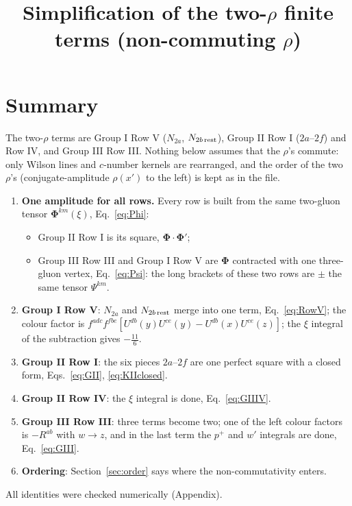 \documentclass[10pt]{article}
\title{Simplification of the two-$\rho$ finite terms (non-commuting $\rho$)}
\author{}
\date{}
\numberwithin{equation}{section}
\begin{document}
\maketitle
\tableofcontents

\section{Summary}

The two-$\rho$ terms are Group I Row V ($N_{2a}$, $N_{2b\,\rm rest}$), Group II Row I ($2a$--$2f$) and Row IV, and Group III Row III. Nothing below assumes that the $\rho$'s commute: only Wilson lines and $c$-number kernels are rearranged, and the order of the two $\rho$'s (conjugate-amplitude $\rho(x')$ to the left) is kept as in the file.

\begin{enumerate}
\item \textbf{One amplitude for all rows.} Every row is built from the same two-gluon tensor $\mathbf{\Phi}^{km}(\xi)$, Eq.~\eqref{eq:Phi}:
\begin{itemize}
\item Group II Row I is its square, $\mathbf{\Phi}\cdot\mathbf{\Phi}'$;
\item Group III Row III and Group I Row V are $\mathbf{\Phi}$ contracted with one three-gluon vertex, Eq.~\eqref{eq:Psi}: the long brackets of these two rows are $\pm$ the same tensor $\Psi^{km}$.
\end{itemize}
\item \textbf{Group I Row V}: $N_{2a}$ and $N_{2b\,\rm rest}$ merge into one term, Eq.~\eqref{eq:RowV}; the colour factor is $f^{adc}f^{fbe}[U^{db}(y)U^{ce}(y)-U^{db}(x)U^{ce}(z)]$; the $\xi$ integral of the subtraction gives $-\tfrac{11}{6}$.
\item \textbf{Group II Row I}: the six pieces $2a$--$2f$ are one perfect square with a closed form, Eqs.~\eqref{eq:GII}, \eqref{eq:KIIclosed}.
\item \textbf{Group II Row IV}: the $\xi$ integral is done, Eq.~\eqref{eq:GIIIV}.
\item \textbf{Group III Row III}: three terms become two; one of the left colour factors is $-R^{ab}$ with $w\to z$, and in the last term the $p^{+}$ and $w'$ integrals are done, Eq.~\eqref{eq:GIII}.
\item \textbf{Ordering}: Section~\ref{sec:order} says where the non-commutativity enters.
\end{enumerate}
All identities were checked numerically (Appendix).
\end{document}

